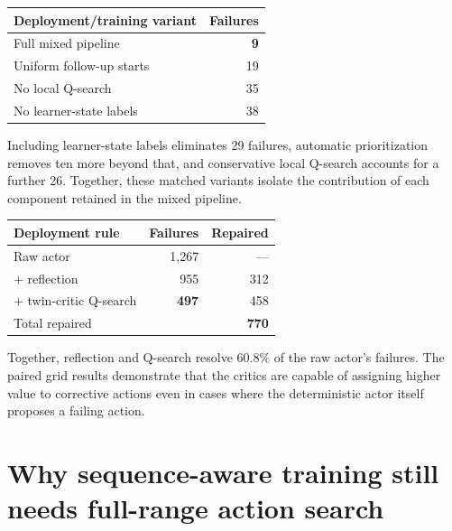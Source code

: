 \vspace{4mm}
\begin{minipage}[t]{.47\textwidth}
\centering
\footnotesize
{}
\label{tab:mixed-ablation}
\begin{tabular}{lr}
\toprule
Deployment/training variant & Failures\\
\midrule
Full mixed pipeline & \textbf{9}\\
Uniform follow-up starts & 19\\
No local Q-search & 35\\
No learner-state labels & 38\\
\bottomrule
\end{tabular}

\vspace{1mm}
\footnotesize\raggedright
Including learner-state labels eliminates 29 failures, automatic
prioritization removes ten more beyond that, and conservative local
Q-search accounts for a further 26. Together, these matched variants
isolate the contribution of each component retained in the mixed
pipeline.
\end{minipage}\hfill
\begin{minipage}[t]{.47\textwidth}
\centering
\footnotesize
{}
\label{tab:pure-ablation}
\begin{tabular}{lrr}
\toprule
Deployment rule & Failures & Repaired\\
\midrule
Raw actor & 1,267 & ---\\
$+$ reflection & 955 & 312\\
$+$ twin-critic Q-search & \textbf{497} & 458\\
\midrule
Total repaired & & \textbf{770}\\
\bottomrule
\end{tabular}

\vspace{1mm}
\footnotesize\raggedright
Together, reflection and Q-search resolve 60.8\% of the raw actor's
failures. The paired grid results demonstrate that the critics are
capable of assigning higher value to corrective actions even in cases
where the deterministic actor itself proposes a failing action.
\end{minipage}

\clearpage
\onecolumn
\section{Why sequence-aware training still needs full-range action search}

